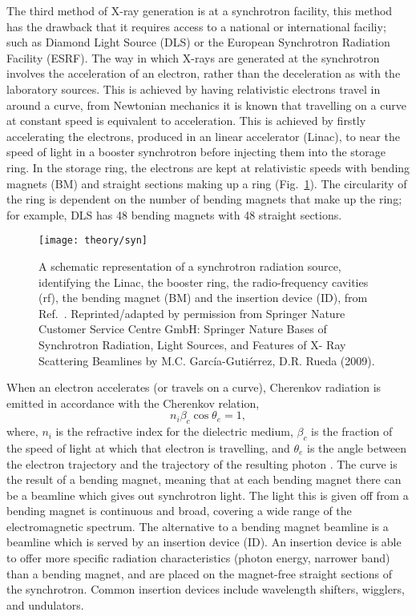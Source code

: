 The third method of X-ray generation is at a synchrotron facility, this method has the drawback that it requires access to a national or international faciliy; such as Diamond Light Source (DLS) or the European Synchrotron Radiation Facility (ESRF). The way in which X-rays are generated at the synchrotron involves the acceleration of an electron, rather than the deceleration as with the laboratory sources. This is achieved by having relativistic electrons travel in around a curve, from Newtonian mechanics it is known that travelling on a curve at constant speed is equivalent to acceleration. This is achieved by firstly accelerating the electrons, produced in an linear accelerator (Linac), to near the speed of light in a booster synchrotron before injecting them into the storage ring. In the storage ring, the electrons are kept at relativistic speeds with bending magnets (BM) and straight sections making up a ring (Fig.~\ref{fig:syn}). The circularity of the ring is dependent on the number of bending magnets that make up the ring; for example, DLS has 48 bending magnets with 48 straight sections.
%
\begin{figure}
	\centering
	\texttt{[image: theory/syn]}
	\caption{A schematic representation of a synchrotron radiation source, identifying the Linac, the booster ring, the radio-frequency cavities (rf), the bending magnet (BM) and the insertion device (ID), from Ref.~\cite{Garcia-Gutierrez2009}. Reprinted/adapted by permission from Springer Nature Customer Service Centre GmbH: Springer Nature Bases of Synchrotron Radiation, Light Sources, and Features of X- Ray Scattering Beamlines by M.C. Garc\'{i}a-Guti\'{e}rrez, D.R. Rueda\textsuperscript{\textcopyright} (2009).}
	\label{fig:syn}
\end{figure}
%

When an electron accelerates (or travels on a curve), Cherenkov radiation is emitted in accordance with the Cherenkov relation,
%
\begin{equation}
	n_i\beta_c\cos{\theta_e} = 1,
\end{equation}
%
where, $n_i$ is the refractive index for the dielectric medium, $\beta_c$ is the fraction of the speed of light at which that electron is travelling, and $\theta_e$ is the angle between the electron trajectory and the trajectory of the resulting photon \cite{Garcia-Gutierrez2009}. The curve is the result of a bending magnet, meaning that at each bending magnet there can be a beamline which gives out synchrotron light. The light this is given off from a bending magnet is continuous and broad, covering a wide range of the electromagnetic spectrum. The alternative to a bending magnet beamline is a beamline which is served by an insertion device (ID). An insertion device is able to offer more specific radiation characteristics (photon energy, narrower band) than a bending magnet, and are placed on the magnet-free straight sections of the synchrotron. Common insertion devices include wavelength shifters, wigglers, and undulators.

